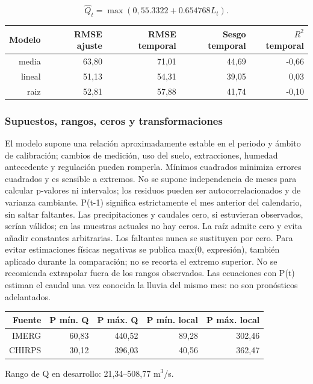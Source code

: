 \documentclass[10pt,a4paper]{article}
\begin{document}
\begin{equation}
\widehat{Q}_t=\max\left(0,55.3322+0.654768L_t\right).
\end{equation}

\begin{center}\small\begin{tabular}{rrrrr}\hline
Modelo & RMSE ajuste & RMSE temporal & Sesgo temporal & $R^2$ temporal \\ \hline
media & 63,80 & 71,01 & 44,69 & -0,66 \\
lineal & 51,13 & 54,31 & 39,05 & 0,03 \\
raiz & 52,81 & 57,88 & 41,74 & -0,10 \\
\hline\end{tabular}\end{center}
\subsubsection*{Supuestos, rangos, ceros y transformaciones}
El modelo supone una relación aproximadamente estable en el periodo y ámbito de calibración; cambios de medición, uso del suelo, extracciones, humedad antecedente y regulación pueden romperla. Mínimos cuadrados minimiza errores cuadrados y es sensible a extremos. No se supone independencia de meses para calcular p-valores ni intervalos; los residuos pueden ser autocorrelacionados y de varianza cambiante. P(t-1) significa estrictamente el mes anterior del calendario, sin saltar faltantes. Las precipitaciones y caudales cero, si estuvieran observados, serían válidos; en las muestras actuales no hay ceros. La raíz admite cero y evita añadir constantes arbitrarias. Los faltantes nunca se sustituyen por cero. Para evitar estimaciones físicas negativas se publica max(0, expresión), también aplicado durante la comparación; no se recorta el extremo superior. No se recomienda extrapolar fuera de los rangos observados. Las ecuaciones con P(t) estiman el caudal una vez conocida la lluvia del mismo mes: no son pronósticos adelantados.
\begin{center}\small\begin{tabular}{rrrrr}\hline
Fuente & P mín. Q & P máx. Q & P mín. local & P máx. local \\ \hline
IMERG & 60,83 & 440,52 & 89,28 & 302,46 \\
CHIRPS & 30,12 & 396,03 & 40,56 & 362,47 \\
\hline\end{tabular}\end{center}
Rango de Q en desarrollo: 21,34--508,77 m$^3$/s.
\end{document}
